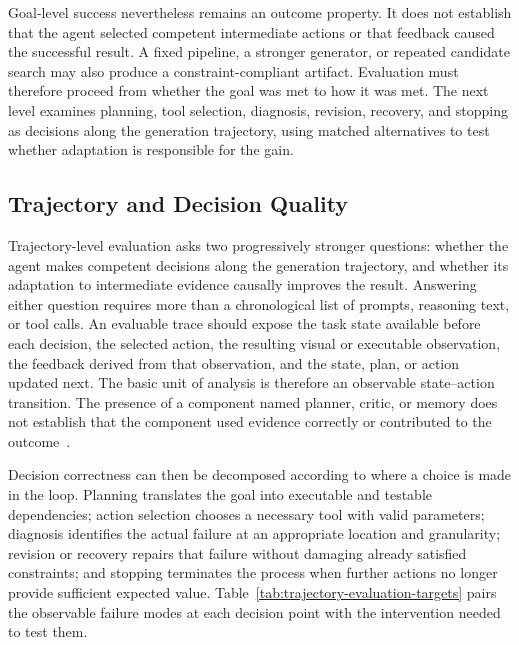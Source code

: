 Goal-level success nevertheless remains an outcome property. It does not establish that the agent selected competent intermediate actions or that feedback caused the successful result. A fixed pipeline, a stronger generator, or repeated candidate search may also produce a constraint-compliant artifact. Evaluation must therefore proceed from whether the goal was met to how it was met. The next level examines planning, tool selection, diagnosis, revision, recovery, and stopping as decisions along the generation trajectory, using matched alternatives to test whether adaptation is responsible for the gain.

\subsection{Trajectory and Decision Quality}
\label{subsec:trajectory-quality}

Trajectory-level evaluation asks two progressively stronger questions: whether the agent makes competent decisions along the generation trajectory, and whether its adaptation to intermediate evidence causally improves the result. Answering either question requires more than a chronological list of prompts, reasoning text, or tool calls. An evaluable trace should expose the task state available before each decision, the selected action, the resulting visual or executable observation, the feedback derived from that observation, and the state, plan, or action updated next. The basic unit of analysis is therefore an observable state--action transition. The presence of a component named planner, critic, or memory does not establish that the component used evidence correctly or contributed to the outcome~\cite{avg250915160,avg260526144,avg260608091}.

Decision correctness can then be decomposed according to where a choice is made in the loop. Planning translates the goal into executable and testable dependencies; action selection chooses a necessary tool with valid parameters; diagnosis identifies the actual failure at an appropriate location and granularity; revision or recovery repairs that failure without damaging already satisfied constraints; and stopping terminates the process when further actions no longer provide sufficient expected value. Table~\ref{tab:trajectory-evaluation-targets} pairs the observable failure modes at each decision point with the intervention needed to test them.

